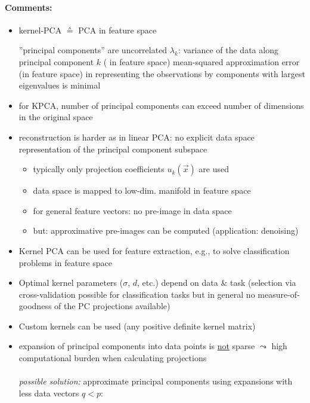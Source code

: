 \paragraph{Comments:}
\begin{itemize}
\item kernel-PCA $\corresponds$ PCA in feature space
  \begin{itemize}
    \itr ''principal components'' are uncorrelated
    \itr $\lambda_k$: variance of the data along principal component
    $k$ ( in feature space)
    \itr mean-squared approximation error (in feature space) in representing the 
    observations by components with largest eigenvalues
    is minimal
  \end{itemize}
\item for KPCA, number of principal components can exceed number of
  dimensions in the original space
  \item reconstruction is harder as in linear PCA: no explicit data space representation of the 
  principal component subspace
  \begin{itemize}
   \item typically only projection coefficients $u_k(\vec{x})$ are used
   \item data space is mapped to low-dim. manifold in feature space
   \item for general feature vectors: no pre-image in data space
   \item but: approximative pre-images can be computed (application: denoising)
  \end{itemize}
  \item Kernel PCA can be used for feature extraction, e.g., to solve classification problems in feature space
  \item Optimal kernel parameters ($\sigma$, $d$, etc.) depend on data \& task (selection via cross-validation possible for classification tasks but in general no measure-of-goodness of the PC projections available)
  \item Custom kernels can be used (any positive definite kernel matrix)
\item expansion of principal components into data points is 
  \underline{not} sparse
    $\leadsto$ high computational burden when calculating projections
    \\\\
    \emph{possible solution:} approximate principal components using expansions with less data
    vectors $q < p$:
    \begin{equation*}
      \begin{array}{ll}

\end{array}
\end{equation*}
\end{itemize}

